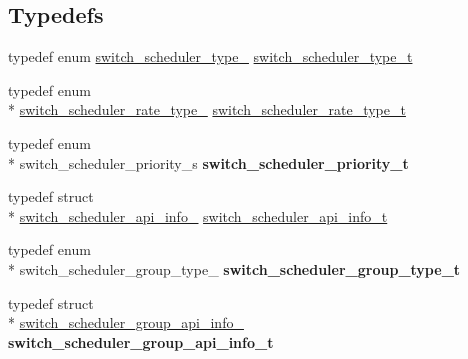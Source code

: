 \subsection*{Typedefs}
\begin{DoxyCompactItemize}
\item 
typedef enum \hyperlink{group__Scheduler_gab958915b2985910d70073c1f50f1db2c}{switch\+\_\+scheduler\+\_\+type\+\_\+} \hyperlink{group__Scheduler_ga62f91884031e17accd1bfa6d07bcddd5}{switch\+\_\+scheduler\+\_\+type\+\_\+t}
\item 
typedef enum \\*
\hyperlink{group__Scheduler_gabdcb6853f591a9102e7a108eb4d7b331}{switch\+\_\+scheduler\+\_\+rate\+\_\+type\+\_\+} \hyperlink{group__Scheduler_gafaa6b883d003bac33a4e76086ae90e3b}{switch\+\_\+scheduler\+\_\+rate\+\_\+type\+\_\+t}
\item 
\hypertarget{group__Scheduler_ga03628122b1af47035f643dd2b585f6cf}{typedef enum \\*
switch\+\_\+scheduler\+\_\+priority\+\_\+s {\bfseries switch\+\_\+scheduler\+\_\+priority\+\_\+t}}\label{group__Scheduler_ga03628122b1af47035f643dd2b585f6cf}

\item 
typedef struct \\*
\hyperlink{structswitch__scheduler__api__info__}{switch\+\_\+scheduler\+\_\+api\+\_\+info\+\_\+} \hyperlink{group__Scheduler_ga3e981ad1a349d10503bfbba6cd3b2f0d}{switch\+\_\+scheduler\+\_\+api\+\_\+info\+\_\+t}
\item 
\hypertarget{group__Scheduler_ga4a5275d5b7f13520a56eedacbf3ceb53}{typedef enum \\*
switch\+\_\+scheduler\+\_\+group\+\_\+type\+\_\+ {\bfseries switch\+\_\+scheduler\+\_\+group\+\_\+type\+\_\+t}}\label{group__Scheduler_ga4a5275d5b7f13520a56eedacbf3ceb53}

\item 
\hypertarget{group__Scheduler_gae19fd1b380e5a606f012fce472e58cd3}{typedef struct \\*
\hyperlink{structswitch__scheduler__group__api__info__}{switch\+\_\+scheduler\+\_\+group\+\_\+api\+\_\+info\+\_\+} {\bfseries switch\+\_\+scheduler\+\_\+group\+\_\+api\+\_\+info\+\_\+t}}\label{group__Scheduler_gae19fd1b380e5a606f012fce472e58cd3}

\end{DoxyCompactItemize}
